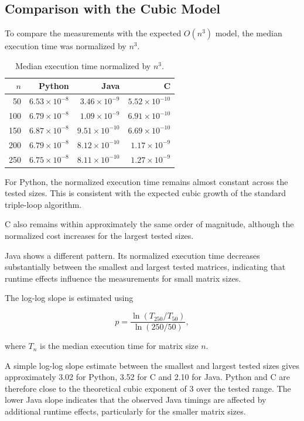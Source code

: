 \documentclass[11pt,a4paper]{article}
\begin{document}
\subsection{Comparison with the Cubic Model}

To compare the measurements with the expected $O(n^3)$ model, the median execution time was normalized by $n^3$.

\begin{table}[H]
\centering
\caption{Median execution time normalized by $n^3$.}
\label{tab:normalized}
\begin{tabular}{rrrr}
\toprule
$n$ & Python & Java & C \\
\midrule
50  & $6.53\times10^{-8}$ & $3.46\times10^{-9}$ & $5.52\times10^{-10}$ \\
100 & $6.79\times10^{-8}$ & $1.09\times10^{-9}$ & $6.91\times10^{-10}$ \\
150 & $6.87\times10^{-8}$ & $9.51\times10^{-10}$ & $6.69\times10^{-10}$ \\
200 & $6.79\times10^{-8}$ & $8.12\times10^{-10}$ & $1.17\times10^{-9}$ \\
250 & $6.75\times10^{-8}$ & $8.11\times10^{-10}$ & $1.27\times10^{-9}$ \\
\bottomrule
\end{tabular}
\end{table}

For Python, the normalized execution time remains almost constant across the tested sizes. This is consistent with the expected cubic growth of the standard triple-loop algorithm.

C also remains within approximately the same order of magnitude, although the normalized cost increases for the largest tested sizes.

Java shows a different pattern. Its normalized execution time decreases substantially between the smallest and largest tested matrices, indicating that runtime effects influence the measurements for small matrix sizes.

The log-log slope is estimated using

\[
p = \frac{\ln(T_{250}/T_{50})}{\ln(250/50)},
\]

where $T_n$ is the median execution time for matrix size $n$.

A simple log-log slope estimate between the smallest and largest tested sizes gives approximately 3.02 for Python, 3.52 for C and 2.10 for Java.
Python and C are therefore close to the theoretical cubic exponent of 3 over the tested range. The lower Java slope indicates that the observed Java timings are affected by additional runtime effects, particularly for the smaller matrix sizes.
\end{document}

